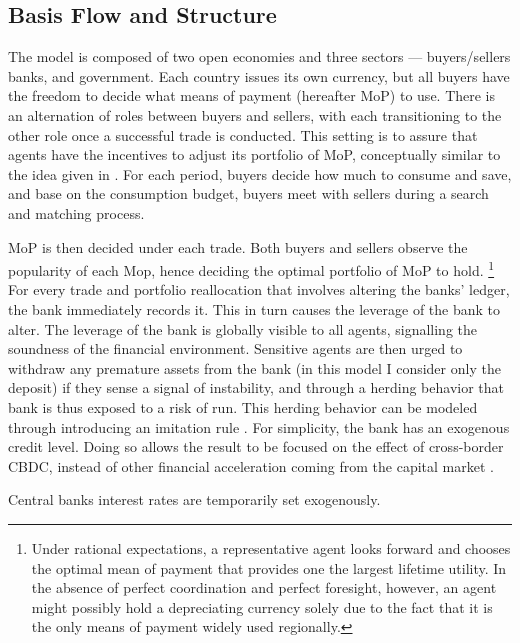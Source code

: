 \subsection{Basis Flow and Structure}

The model is composed of two open economies and three sectors --- buyers/sellers
banks, and government. Each country issues its own currency, but all buyers have
the freedom to decide what means of payment (hereafter MoP) to use.  There is
an alternation of roles between buyers and sellers, with each transitioning to
the other role once a successful trade is conducted. This setting is to assure
that agents have the incentives to adjust its portfolio of MoP, conceptually
similar to the idea given in \citet*{TW95}. For each period, buyers decide how
much to consume and save, and base on the consumption budget, buyers meet with
sellers during a search and matching process.

MoP is then decided under each trade. Both buyers and sellers observe the
popularity of each Mop, hence deciding the optimal portfolio of MoP to hold.
\footnote{Under rational expectations, a representative agent looks forward and
chooses the optimal mean of payment that provides one the largest lifetime
utility. In the absence of perfect coordination and perfect foresight, however,
an agent might possibly hold a depreciating currency solely due to the fact that
it is the only means of payment widely used regionally.}
For every trade and portfolio reallocation that involves altering the banks'
ledger, the bank immediately records it. This in turn causes the leverage of the
bank to alter. The leverage of the bank is globally visible to all agents,
signalling the soundness of the financial environment. Sensitive agents are then
urged to withdraw any premature assets from the bank (in this model I consider
only the deposit) if they sense a signal of instability, and through a herding
behavior that bank is thus exposed to a risk of run. This herding behavior can be
modeled through introducing an imitation rule \citep*{Santos2021}. For
simplicity, the bank has an exogenous credit level. Doing so allows the result
to be focused on the effect of cross-border CBDC, instead of other financial
acceleration coming from the capital market \citep{BGG96}.

Central banks interest rates are temporarily set exogenously.

